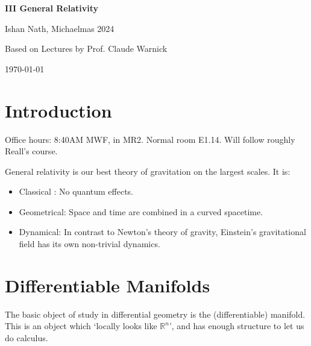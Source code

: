 \documentclass[12pt]{article}
\begin{document}
\hypersetup{pageanchor=false}
\begin{titlepage}
	\begin{center}
		\vspace*{1em}
		\Huge
		\textbf{III General Relativity}

		\vspace{1em}
		\large
		Ishan Nath, Michaelmas 2024

		\vspace{1.5em}

		\Large

		Based on Lectures by Prof. Claude Warnick

		\vspace{1em}

		\large
		\today
	\end{center}
	
\end{titlepage}
\hypersetup{pageanchor=true}

\tableofcontents

\newpage


\setcounter{section}{-1}

\section{Introduction}%
\label{sec:intro}

Office hours: 8:40AM MWF, in MR2. Normal room E1.14. Will follow roughly Reall's course.

General relativity is our best theory of gravitation on the largest scales. It is:
\begin{itemize}
	\item Classical : No quantum effects.
	\item Geometrical: Space and time are combined in a curved spacetime.
	\item Dynamical: In contrast to Newton's theory of gravity, Einstein's gravitational field has its own non-trivial dynamics.
\end{itemize}

\newpage

\section{Differentiable Manifolds}%
\label{sec:diff_man}

The basic object of study in differential geometry is the (differentiable) manifold. This is an object which `locally looks like $\mathbb{R}^n$', and has enough structure to let us do calculus.
\end{document}
